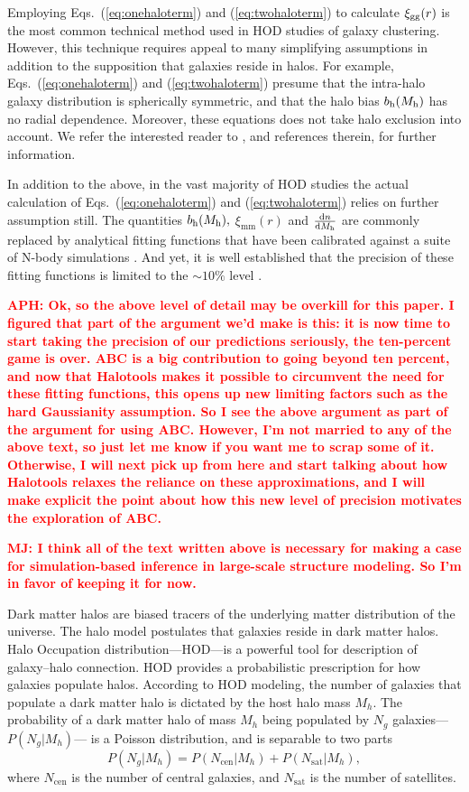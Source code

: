 \documentclass[12pt, preprint]{aastex}
\newcommand{\todo}[1]{{\bf \textcolor{red}{ #1}}}
\newcommand{\beq}{\begin{equation}}
\newcommand{\eeq}{\end{equation}}
\begin{document}
Employing Eqs.~(\ref{eq:onehaloterm}) and (\ref{eq:twohaloterm}) to 
calculate $\xi_{\mathrm{gg}}(r)$ is the most common technical method used in HOD 
studies of galaxy clustering. 
However, this technique requires appeal to many simplifying assumptions 
in addition to the supposition that galaxies reside in halos. For example, 
Eqs.~(\ref{eq:onehaloterm}) and (\ref{eq:twohaloterm}) presume that 
the intra-halo galaxy distribution is spherically symmetric, and 
that the halo bias $b_{\mathrm{h}}(M_{\rm h})$ has no radial dependence. 
Moreover, these equations does not take halo exclusion into account. 
We refer the interested reader to \citet{cooray02,mo_vdb_white10,vdBosch13}, 
and references therein, for further information. 

In addition to the above, in the vast majority of HOD studies the actual calculation of 
Eqs.~(\ref{eq:onehaloterm}) and (\ref{eq:twohaloterm}) relies on further assumption still. 
The quantities $b_{\mathrm{h}}(M_{\rm h}),$ $\xi_{\mathrm{mm}}(r)$ and $\frac{\mathrm{d} n}{\mathrm{d}M_{\rm h}}$ 
are commonly replaced by analytical fitting functions that have been calibrated 
against a suite of N-body simulations \citep[e.g.,][]{sheth_tormen01,smith03,tinker05,tinker10}.   
And yet, it is well established that the precision of these fitting functions is 
limited to the $\sim10\%$ level \citep[e.g.][]{tinker08}. 

\todo{APH: Ok, so the above level of detail may be overkill for this paper. I figured that part of the argument we'd make is this: it is now time to start taking the precision of our predictions seriously, the ten-percent game is over. ABC is a big contribution to going beyond ten percent, and now that Halotools makes it possible to circumvent the need for these fitting functions, this opens up new limiting factors such as the hard Gaussianity assumption. So I see the above argument as part of the argument for using ABC. However, I'm not married to any of the above text, so just let me know if you want me to scrap some of it. Otherwise, I will next pick up from here and start talking about how Halotools relaxes the reliance on these approximations, and I will make explicit the point about how this new level of precision motivates the exploration of ABC.}

\todo{MJ: I think all of the text written above is necessary for making a case for simulation-based inference in large-scale structure modeling. So I'm in favor of keeping it for now.}


Dark matter halos are biased tracers of the underlying matter distribution of the universe. The halo model postulates that galaxies reside in dark matter halos. Halo Occupation distribution---HOD---is a powerful tool for description of galaxy--halo connection. HOD provides a probabilistic prescription for how galaxies populate halos. According to HOD modeling, the number of galaxies that populate a dark matter halo is dictated by the host halo mass $M_h$. The probability of a dark matter halo of mass $M_h$ being populated by $N_g$ galaxies---$P(N_g|M_h)$--- is a Poisson distribution, and is separable to two parts 
\beq
P(N_g|M_h) = P(N_\mathrm{cen}|M_h) + P(N_\mathrm{sat}|M_h),
\eeq
where $N_\mathrm{cen}$ is the number of central galaxies, and $N_\mathrm{sat}$ is the number of satellites. 
\end{document}
